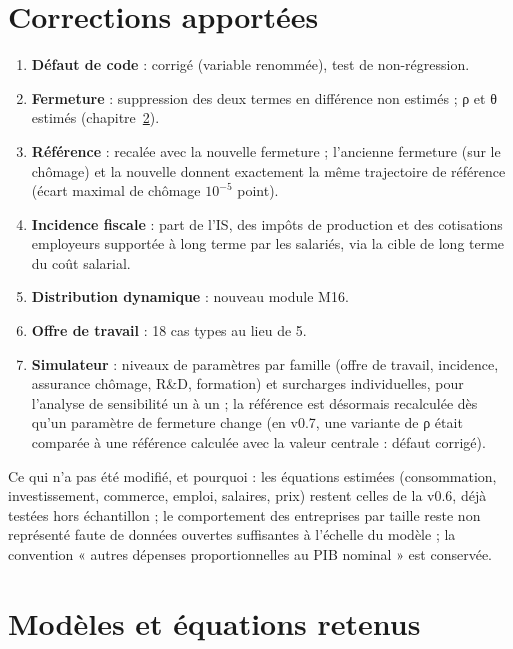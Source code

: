 \chapter{Corrections apportées}\label{ch:corrections}

\begin{enumerate}
\item \textbf{Défaut de code} : corrigé (variable renommée), test de non-régression.
\item \textbf{Fermeture} : suppression des deux termes en différence non estimés ; ρ et θ estimés (chapitre~\ref{ch:equations}).
\item \textbf{Référence} : recalée avec la nouvelle fermeture ; l'ancienne fermeture (sur le chômage) et la nouvelle
donnent exactement la même trajectoire de référence (écart maximal de chômage $10^{-5}$ point).
\item \textbf{Incidence fiscale} : part de l'IS, des impôts de production et des cotisations employeurs supportée à
long terme par les salariés, via la cible de long terme du coût salarial.
\item \textbf{Distribution dynamique} : nouveau module M16.
\item \textbf{Offre de travail} : 18 cas types au lieu de 5.
\item \textbf{Simulateur} : niveaux de paramètres par famille (offre de travail, incidence, assurance chômage, R\&D,
formation) et surcharges individuelles, pour l'analyse de sensibilité un à un ; la référence est désormais recalculée
dès qu'un paramètre de fermeture change (en v0.7, une variante de ρ était comparée à une référence calculée avec
la valeur centrale : défaut corrigé).
\end{enumerate}

Ce qui n'a pas été modifié, et pourquoi : les équations estimées (consommation, investissement, commerce, emploi,
salaires, prix) restent celles de la v0.6, déjà testées hors échantillon ; le comportement des entreprises par taille
reste non représenté faute de données ouvertes suffisantes à l'échelle du modèle ; la convention « autres dépenses
proportionnelles au PIB nominal » est conservée.

\chapter{Modèles et équations retenus}\label{ch:equations}

